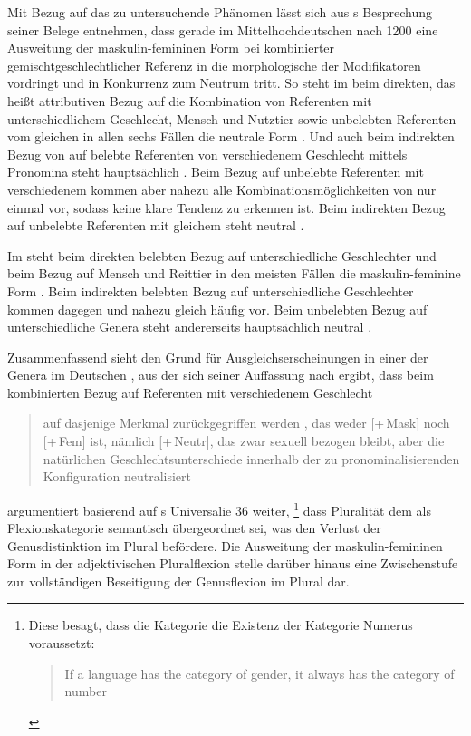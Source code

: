 Mit Bezug auf das zu untersuchende Phänomen lässt sich aus
\citeauthor{askedal1973}s Besprechung seiner Belege entnehmen, dass gerade im
Mittelhochdeutschen nach 1200 eine Ausweitung der
maskulin-femininen Form bei kombinierter gemischt\-geschlechtlicher Referenz in
die morphologische  der Modifikatoren vordringt und in Konkurrenz
zum Neutrum tritt. So steht im  beim direkten, das heißt
attributiven Bezug auf die Kombination von Referenten mit
unterschiedlichem Geschlecht, Mensch und Nutztier sowie unbelebten Referenten
vom gleichen  in allen sechs Fällen die neutrale Form .
Und auch beim indirekten Bezug von  auf belebte
Referenten von verschiedenem Geschlecht mittels Pronomina steht hauptsächlich
. Beim Bezug auf unbelebte Referenten mit verschiedenem
 kommen aber nahezu alle Kombinationsmöglichkeiten von
 nur einmal vor, sodass keine klare Tendenz zu
erkennen ist. Beim indirekten Bezug auf unbelebte Referenten mit gleichem
 steht neutral  \autocites[145--148,
158--161]{askedal1973}[nach][]{lachmannhartl1952}.

Im  steht beim direkten belebten Bezug auf
unterschiedliche Geschlechter und beim Bezug auf Mensch und Reittier in den
meisten Fällen die maskulin-feminine Form . Beim indirekten
belebten Bezug auf unterschiedliche Geschlechter kommen dagegen
 und  nahezu gleich häufig vor. Beim unbelebten
Bezug auf unterschiedliche Genera steht andererseits hauptsächlich
neutral  \autocites[95--99,
126--128]{askedal1973}[nach][]{maroldschroeder1969}.

Zusammenfassend sieht \citeauthor{askedal1973} den Grund für
Ausgleichserscheinungen in einer  der
Genera im Deutschen
\autocite[241--247]{askedal1973}, aus der sich seiner Auffassung nach ergibt,
dass beim kombinierten Bezug auf Referenten mit verschiedenem Geschlecht
\blockcquote[253]{askedal1973}{auf dasjenige Merkmal zurückgegriffen werden
, das weder [+\,Mask] noch [+\,Fem] ist, nämlich [+\,Neutr], das
zwar sexuell bezogen bleibt, aber die natürlichen Geschlechts\-unterschiede
innerhalb der zu pronominalisierenden Konfiguration neutralisiert}.
\citet[173--177]{askedal1973} argumentiert basierend auf
\citeauthor{greenberg1966}s Universalie 36 weiter,%
%
	\footnote{Diese besagt, dass die Kategorie  die Existenz der
		Kategorie Numerus voraussetzt:
		\foreignblockcquote{english}[112]{greenberg1966}{If a language has
		the category of gender, it always has the category of
		number}.%
	}
%
dass Pluralität dem  als Flexionskategorie semantisch übergeordnet
sei, was den Verlust der Genusdistinktion im Plural befördere. Die Ausweitung
der maskulin-femininen Form in der adjektivischen
Plural\-flexion stelle darüber hinaus eine
Zwischenstufe zur vollständigen Beseitigung der Genusflexion im Plural dar.

